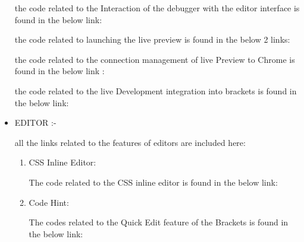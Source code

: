 \begin{itemize}
\begin{center}
the code related to the Interaction of the debugger with the editor interface is found
in the below link: 
\end{center}
\begin{center}
the code related to launching the live preview is found in the below 2 links:   
\end{center}
\begin{center}
the code related to the connection management of live Preview to Chrome is found
in the below link : 
\end{center}
\begin{center}
the code related to the live Development integration into brackets is found in the
below link:  
\end{center}
\item EDITOR :- \newline
\begin{center}
all the links related to the features of editors are included here: 
\end{center}
\begin{enumerate}
\item CSS Inline Editor: 
\begin{center}
 The code related to the CSS inline editor is found in the below link:  
\end{center}
\item Code Hint: 
\begin{center} The codes related to the Quick Edit feature of the Brackets is found in the below
link: \newline

\end{center}
\end{enumerate}
\end{itemize}
